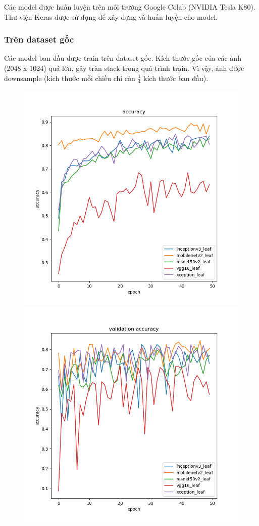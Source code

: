 \documentclass[a4paper,14pt]{extarticle}
\begin{document}
	Các model được huấn luyện trên môi trường Google Colab (NVIDIA Tesla K80). Thư viện Keras được sử dụng để xây dựng và huấn luyện cho model.

	\subsubsection{Trên dataset gốc}
		Các model ban đầu được train trên dataset gốc. Kích thước gốc của các ảnh (2048 x 1024) quá lớn, gây tràn stack trong quá trình train. Vì vậy, ảnh được downsample (kích thước mỗi chiều chỉ còn $\frac{1}{4}$ kích thước ban đầu).

		\begin{figure}[H]
			\centering
			\includegraphics[scale=0.4]{images/leaf_accuracy.png}
			\includegraphics[scale=0.4]{images/leaf_val_accuracy.png}

\end{figure}
\end{document}
